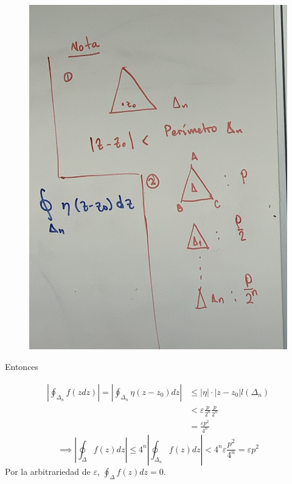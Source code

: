 \begin{teorema}
\begin{dem}
        \begin{cajita}
            \begin{figure}[H]
                \centering
                \includegraphics[scale=0.1]{imagenes/12.2.jpeg}
            \end{figure}
        \end{cajita}
        Entonces 

        \begin{align*}
            \left|\oint_{\Delta_n}f(zdz)\right| = \left| \oint_{\Delta_n}\eta(z-z_0)dz\right|&\leq |\eta|\cdot |z-z_0|l(\Delta_n)\\
            &< \varepsilon \frac{p}{2^n}\frac{p}{2^n}\\
            &= \frac{\varepsilon p^2}{4^n}
        \end{align*}
        $$\implies \left|\oint_\Delta f(z)dz\right|\leq 4^n \left|\oint_{\Delta_n}f(z)dz \right| <4^n \varepsilon \frac{p^2}{4^n}=\varepsilon p^2$$
        Por la arbitrariedad de $\varepsilon$, $\oint_\Delta f(z)dz =0$.
    \end{dem}
\end{teorema}

